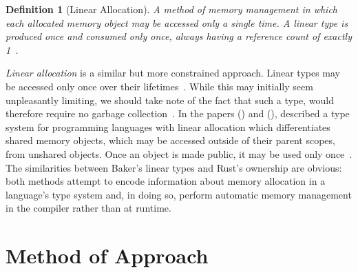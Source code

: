 \documentclass[11pt,draft]{article}
\theoremstyle{break}
\newtheorem{defn}{Definition}
\begin{document}
\begin{defn}[Linear Allocation]
A method of memory management in which each allocated memory object may be accessed only a single time. A linear type is produced once and consumed only once, always having a reference count of exactly 1~\cite{Baker:1992:LLL:142137.142162,hawblitzel2004low,Baker:1995:UVL:199818.199860}.
\end{defn}

\textit{Linear allocation} is a similar but more constrained approach. Linear types may be accessed only once over their lifetimes~\cite{Baker:1992:LLL:142137.142162,hawblitzel2004low,Baker:1995:UVL:199818.199860}. While this may initially seem unpleasantly limiting, we should take note of the fact that such a type, would therefore require no garbage collection~\cite{Baker:1992:LLL:142137.142162,Baker:1995:UVL:199818.199860}. In the papers  (\citeyear{Baker:1992:LLL:142137.142162}) and  (\citeyear{Baker:1995:UVL:199818.199860}), \citeauthor{Baker:1992:LLL:142137.142162} described a type system for programming languages with linear allocation which differentiates shared memory objects, which may be accessed outside of their parent scopes, from unshared objects. Once an object is made public, it may be used only once~\cite{Baker:1995:UVL:199818.199860,Baker:1992:LLL:142137.142162}. The similarities between Baker's linear types and Rust's ownership are obvious: both methods attempt to encode information about memory allocation in a language's type system and, in doing so, perform automatic memory management in the compiler rather than at runtime.



\vspace*{-.1in}
\section{Method of Approach}
\label{sec:method}
\end{document}
